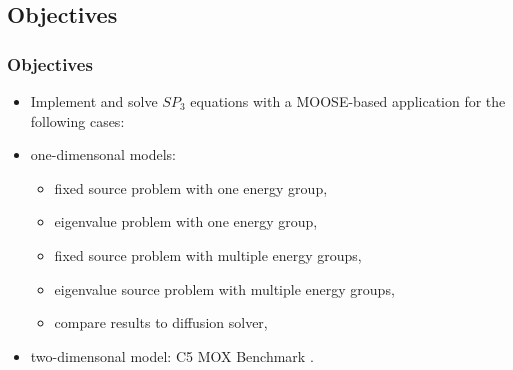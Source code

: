 \subsection{Objectives}
\begin{frame}
\frametitle{Objectives}
  \begin{itemize}
    \item Implement and solve $SP_3$ equations with a MOOSE-based application for the following cases:
    \item one-dimensonal models:
	\begin{itemize}
		\item fixed source problem with one energy group,
		\item eigenvalue problem with one energy group,
		\item fixed source problem with multiple energy groups,
		\item eigenvalue source problem with multiple energy groups,
		\item compare results to diffusion solver,
	\end{itemize}
    \item two-dimensonal model: C5 MOX Benchmark \cite{capilla_applications_2009}.
  \end{itemize}
\end{frame}

